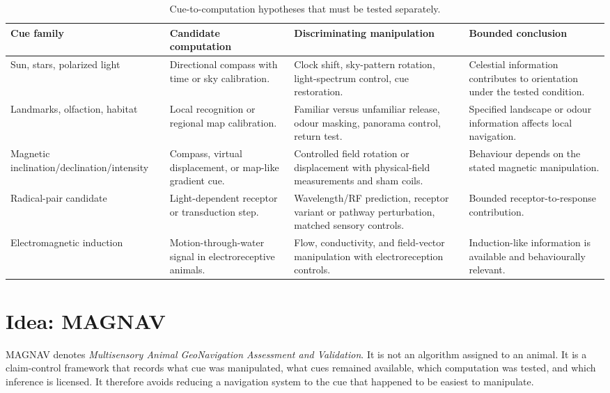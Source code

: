 \documentclass[conference]{IEEEtran}
\begin{document}
\begin{table}[!t]
\caption{Cue-to-computation hypotheses that must be tested separately.}\label{tab:cue-computation}\centering\footnotesize
\begin{tabular}{@{}L{.18\textwidth}L{.20\textwidth}L{.28\textwidth}L{.26\textwidth}@{}}\toprule
Cue family & Candidate computation & Discriminating manipulation & Bounded conclusion\\\midrule
Sun, stars, polarized light & Directional compass with time or sky calibration. & Clock shift, sky-pattern rotation, light-spectrum control, cue restoration. & Celestial information contributes to orientation under the tested condition.\\
Landmarks, olfaction, habitat & Local recognition or regional map calibration. & Familiar versus unfamiliar release, odour masking, panorama control, return test. & Specified landscape or odour information affects local navigation.\\
Magnetic inclination/declination/intensity & Compass, virtual displacement, or map-like gradient cue. & Controlled field rotation or displacement with physical-field measurements and sham coils. & Behaviour depends on the stated magnetic manipulation.\\
Radical-pair candidate & Light-dependent receptor or transduction step. & Wavelength/RF prediction, receptor variant or pathway perturbation, matched sensory controls. & Bounded receptor-to-response contribution.\\
Electromagnetic induction & Motion-through-water signal in electroreceptive animals. & Flow, conductivity, and field-vector manipulation with electroreception controls. & Induction-like information is available and behaviourally relevant.\\\bottomrule
\end{tabular}
\end{table}

\section{Idea: MAGNAV}\label{sec:idea}
MAGNAV denotes \emph{Multisensory Animal GeoNavigation Assessment and Validation}. It is not an algorithm assigned to an animal. It is a claim-control framework that records what cue was manipulated, what cues remained available, which computation was tested, and which inference is licensed. It therefore avoids reducing a navigation system to the cue that happened to be easiest to manipulate.
\end{document}

